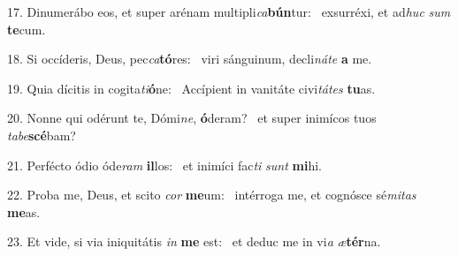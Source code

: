 17. Dinumerábo eos, et super arénam multipli\textit{ca}\textbf{bún}tur: \ast\  exsurréxi, et ad\textit{huc} \textit{sum} \textbf{te}cum.\

18. Si occíderis, Deus, pec\textit{ca}\textbf{tó}res: \ast\  viri sánguinum, decli\textit{ná}\textit{te} \textbf{a} me.\

19. Quia dícitis in cogita\textit{ti}\textbf{ó}ne: \ast\  Accípient in vanitáte civi\textit{tá}\textit{tes} \textbf{tu}as.\

20. Nonne qui odérunt te, Dómi\textit{ne}, \textbf{ó}deram? \ast\  et super inimícos tuos \textit{ta}\textit{be}\textbf{scé}bam?\

21. Perfécto ódio óde\textit{ram} \textbf{il}los: \ast\  et inimíci fac\textit{ti} \textit{sunt} \textbf{mi}hi.\

22. Proba me, Deus, et scito \textit{cor} \textbf{me}um: \ast\  intérroga me, et cognósce sé\textit{mi}\textit{tas} \textbf{me}as.\

23. Et vide, si via iniquitátis \textit{in} \textbf{me} est: \ast\  et deduc me in vi\textit{a} \textit{æ}\textbf{tér}na.\

